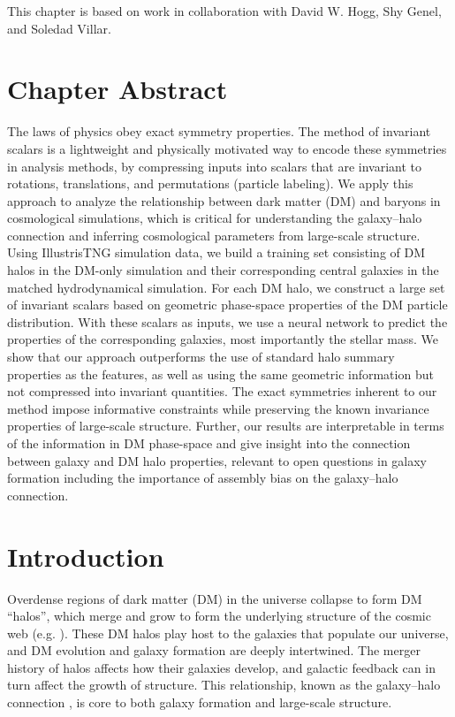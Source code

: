 This chapter is based on work in collaboration with David W. Hogg, Shy Genel, and Soledad Villar.

\graphicspath{{figures/figures_eqcosmo/}}


\section{Chapter Abstract}
The laws of physics obey exact symmetry properties.
The method of invariant scalars is a lightweight and physically motivated way to encode these symmetries in analysis methods, by compressing inputs into scalars that are invariant to rotations, translations, and permutations (particle labeling).
We apply this approach to analyze the relationship between dark matter (DM) and baryons in cosmological simulations, which is critical for understanding the galaxy--halo connection and inferring cosmological parameters from large-scale structure.
Using IllustrisTNG simulation data, we build a training set consisting of DM halos in the DM-only simulation and their corresponding central galaxies in the matched hydrodynamical simulation. 
For each DM halo, we construct a large set of invariant scalars based on geometric phase-space properties of the DM particle distribution.
With these scalars as inputs, we use a neural network to predict the properties of the corresponding galaxies, most importantly the stellar mass.
We show that our approach outperforms the use of standard halo summary properties as the features, as well as using the same geometric information but not compressed into invariant quantities.
The exact symmetries inherent to our method impose informative constraints while preserving the known invariance properties of large-scale structure.
Further, our results are interpretable in terms of the information in DM phase-space and give insight into the connection between galaxy and DM halo properties, relevant to open questions in galaxy formation including the importance of assembly bias on the galaxy--halo connection.


\section{Introduction}

Overdense regions of dark matter (DM) in the universe collapse to form DM ``halos'', which merge and grow to form the underlying structure of the cosmic web (e.g. \citealt{davis_evolution_1985,bond_how_1996,boylan-kolchin_resolving_2009}). 
These DM halos play host to the galaxies that populate our universe, and DM evolution and galaxy formation are deeply intertwined. 
The merger history of halos affects how their galaxies develop, and galactic feedback can in turn affect the growth of structure.
This relationship, known as the galaxy--halo connection \citep{WechslerTinker2018}, is core to both galaxy formation and large-scale structure.

